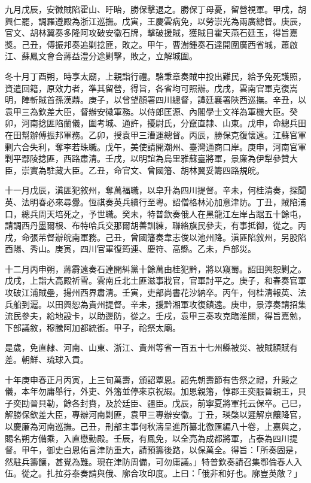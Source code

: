 \begin{pinyinscope}
九月戊辰，安徽賊陷霍山、盱眙，勝保擊退之。勝保丁母憂，留營視軍。甲戌，胡興仁罷，調羅遵殿為浙江巡撫。戊寅，王慶雲病免，以勞崇光為兩廣總督。庚辰，官文、胡林翼奏多隆阿攻破安徽石牌，擊破援賊，獲賊目霍天燕石廷玉，得旨嘉獎。己丑，傅振邦奏追剿捻匪，敗之。甲午，曹澍鍾奏石達開圍廣西省城，蕭啟江、蘇鳳文會合蔣益澧分途剿擊，敗之，立解城圍。

冬十月丁酉朔，時享太廟，上親詣行禮。駱秉章奏賊中投出難民，給予免死護照，資遣回籍，原效力者，準其留營，得旨，各省均可照辦。戊戌，雲南官軍克復嵩明，陣斬賊首孫漢鼎。庚子，以曾望顏署四川總督，譚廷襄署陜西巡撫。辛丑，以袁甲三為欽差大臣，督辦安徽軍務。以侍郎匡源、內閣學士文祥為軍機大臣。癸卯，河南捻匪陷蘭儀，圍考城、通許，擾尉氏，分竄直隸、山東。戊申，命總兵田在田幫辦傅振邦軍務。乙卯，授袁甲三漕運總督。丙辰，勝保克復懷遠。江蘇官軍剿六合失利，奪李若珠職。戊午，美使請開潮州、臺灣通商口岸。庚申，河南官軍剿平鄢陵捻匪，西路肅清。壬戌，以明誼為烏里雅蘇臺將軍，景廉為伊犁參贊大臣，崇實為駐藏大臣。乙丑，命官文、曾國籓、胡林翼妥籌四路規皖。

十一月戊辰，滇匪犯敘州，奪萬福職，以皁升為四川提督。辛未，何桂清奏，探聞英、法明春必來尋釁。恆祺奏英兵續行至粵。詔僧格林沁加意津防。丁丑，賊陷浦口，總兵周天培死之，予世職。癸未，特普欽奏俄人在黑龍江左岸占踞五十餘屯，請調西丹墨爾根、布特哈兵交那爾胡善訓練，聯絡旗民參夫，有事抵御，從之。丙戌，命張芾督辦皖南軍務。己丑，曾國籓奏韋志俊以池州降。滇匪陷敘州，另股陷酉陽、秀山。庚寅，四川官軍復筠連、慶符、高縣。乙未，戶部災。

十二月丙申朔，蔣霨遠奏石達開糾黨十餘萬由桂犯黔，將以窺蜀。詔田興恕剿之。戊戌，上詣大高殿祈雪。雲南丘北土匪滋事戕官，官軍討平之。庚子，和春奏官軍攻破江浦賊壘，揚州西界肅清。壬寅，吏部尚書花沙納卒。丙午，何桂清報英、法兵船到滬。以田興恕為貴州提督。辛未，援黔湘軍攻復鎮遠。庚申，景淳奏請招集流民參夫，給地設卡，以助邊防，從之。壬戌，袁甲三奏攻克臨淮關，得旨嘉勉，下部議敘，穆騰阿加都統銜。甲子，祫祭太廟。

是歲，免直隸、河南、山東、浙江、貴州等省一百五十七州縣被災、被賊額賦有差。朝鮮、琉球入貢。

十年庚申春正月丙寅，上三旬萬壽，頒詔覃恩。詔先朝壽節有告祭之禮，升殿之儀，本年勿庸舉行，外吏、外籓並停來京祝嘏。加恩親籓，惇郡王奕脤晉親王，貝子奕劻晉貝勒，餘各封賚，及於廷臣、疆臣。戊辰，前寧夏將軍托云保卒。己巳，解勝保欽差大臣，專辦河南剿匪，袁甲三專辦安徽。丁丑，瑛棨以遲解京饟降官，以慶廉為河南巡撫。己丑，刑部主事何秋濤呈進所纂北徼匯編八十卷，上嘉與之，賜名朔方備乘，入直懋勤殿。壬辰，有鳳免，以全亮為成都將軍，占泰為四川提督。甲午，御史白恩佑言津防重大，請預籌後路，以保萬全。得旨：「所奏固是，然駐兵籌饟，甚覺為難。現在津防周備，可勿庸議。」特普欽奏請召集鄂倫春人入伍。從之。扎拉芬泰奏請與俄、廓合攻印度。上曰：「俄非和好也。廓豈英敵？」


\end{pinyinscope}
